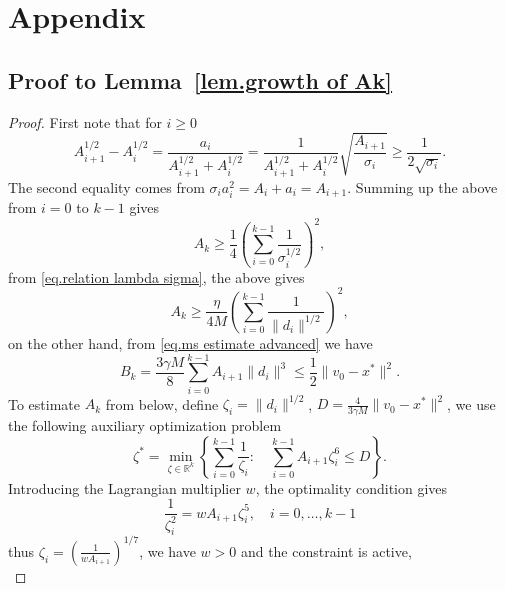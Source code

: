 \documentclass{mcom-l}
\numberwithin{equation}{section}
\begin{document}



\clearpage
\section*{Appendix}
\appendix
\subsection*{Proof to Lemma~\ref{lem.growth of Ak}}
\begin{proof}
    First note that for $i\geq 0$
    \begin{equation*}
        A_{i+1}^{1/2}-A_i^{1/2} = \frac{a_i}{A_{i+1}^{1/2}+A_i^{1/2}}=\frac{1}{A_{i+1}^{1/2}+A_i^{1/2}}\sqrt{\frac{A_{i+1}}{\sigma_i}}\geq \frac{1}{2\sqrt{\sigma_i}}.
    \end{equation*}
    The second equality comes from $\sigma_ia_i^2=A_i+a_i=A_{i+1}$. Summing up the above from $i=0$ to $k-1$ gives
    \begin{equation*}
        A_k \geq \frac{1}{4} \left (\sum_{i=0}^{k-1}\frac{1}{\sigma_i^{1/2}}\right)^2,
    \end{equation*}
    from \eqref{eq.relation lambda sigma}, the above gives
    \begin{equation}\label{eq.Ak helper 1}
        A_k \geq \frac{\eta}{4M} \left (\sum_{i=0}^{k-1} \frac{1}{\|d_i\|^{1/2}}\right)^2,
    \end{equation}
    on the other hand, from \eqref{eq.ms estimate advanced} we have
    \begin{equation*}
        B_k = \frac{3\gamma M}{8}\sum_{i=0}^{k-1} A_{i+1}\|d_i\|^3 \leq \frac{1}{2}\|v_0-x^*\|^2.
    \end{equation*}
    To estimate $A_k$ from below, define $\zeta_i = \|d_i\|^{1/2}$, $D = \frac{4}{3\gamma M}\|v_0-x^*\|^2$, we use the following auxiliary optimization problem
    \begin{equation*}
        \zeta^*=\min _{\zeta \in \mathbb{R}^k}\left\{\sum_{i=0}^{k-1} \frac{1}{\zeta_i}: \quad \sum_{i=0}^{k-1} A_{i+1} \zeta_i^6 \leq D\right\}.
    \end{equation*}
    Introducing the Lagrangian multiplier $w$, the optimality condition gives
    \begin{equation*}
        \frac{1}{\zeta_i^2}=w A_{i+1} \zeta_i^5, \quad i=0, \ldots, k-1
    \end{equation*}
    thus $\zeta_i = \left( \frac{1}{w A_{i+1}}\right)^{1/7}$, we have $w>0$ and the constraint is active,
    \begin{equation*}

\end{equation*}
\end{proof}
\end{document}
